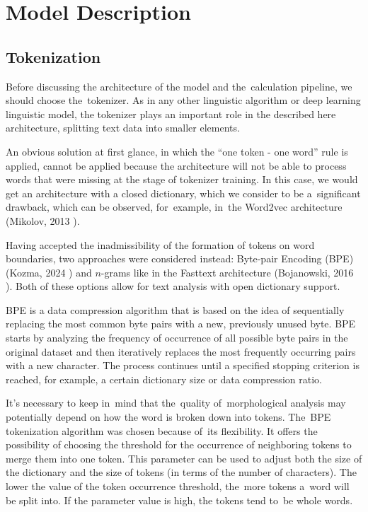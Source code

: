 \documentclass[11pt,twocolumn]{article}
\begin{document}
\section{Model Description}

\subsection{Tokenization}

Before discussing the architecture of the model and the~calculation pipeline,
we should choose the~tokenizer.
As in any other linguistic algorithm or deep learning linguistic model,
the tokenizer plays an important role in the described here architecture,
splitting text data into smaller elements.

An obvious solution at first glance, in which the ``one token - one word'' rule is applied,
cannot
be applied because the architecture will not be able to process words
that were missing at the stage of tokenizer training.
In this case, we would get an architecture with a closed dictionary,
which we consider to be a~significant drawback,
which can be observed, for~example, in~the Word2vec architecture (Mikolov, 2013 \cite{word2vec}).

Having accepted the inadmissibility of the formation of tokens on word boundaries, %
two approaches were considered instead:
Byte-pair Encoding (BPE) (Kozma, 2024 \cite{bpe}) and $n$-grams like in the Fasttext architecture (Bojanowski, 2016 \cite{fasttext}).
Both of these options allow for text analysis with open dictionary support. %

BPE is a data compression algorithm that is based on the idea of sequentially replacing the most common byte pairs with a new, previously unused byte.
BPE starts by analyzing the frequency of occurrence of all possible byte pairs in the original dataset and then iteratively replaces the most frequently occurring pairs with a new character. 
The process continues until a specified stopping criterion is reached, for example, a certain dictionary size or data compression ratio.

It's necessary to keep in~mind  that the~quality of~morphological analysis may potentially depend on how the word is broken down into tokens.
The~BPE tokenization algorithm was chosen because of~its flexibility.
It offers the possibility of choosing the threshold for the occurrence of neighboring tokens to merge them into one token.
This parameter can be used to adjust both the size of the dictionary and the size of tokens (in terms of the number of characters).
The lower the value of the token occurrence threshold,
the~more tokens a~word will be split into.
If the parameter value is high, the tokens tend to~be whole words.
\end{document}
